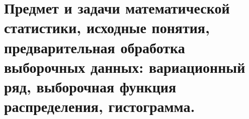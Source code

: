\documentclass[polytech/stats/exam-2023/stats-exam-2023.tex]{subfiles}
\begin{document}
\section{Предмет и задачи математической статистики, исходные понятия, предварительная обработка выборочных данных: вариационный ряд, выборочная функция распределения, гистограмма.}
\end{document}

